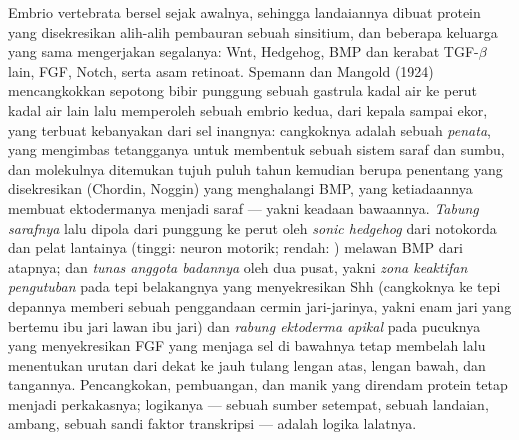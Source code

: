 \begin{definition}\label{def:b3:developmental-genetics:organiser}
%
Embrio vertebrata bersel sejak awalnya, sehingga landaiannya
dibuat protein yang disekresikan alih-alih pembauran sebuah sinsitium, dan
beberapa keluarga yang sama mengerjakan segalanya: Wnt, Hedgehog, BMP dan kerabat
TGF-$\beta$ lain, FGF, Notch, serta asam retinoat. Spemann dan Mangold (1924)
mencangkokkan sepotong bibir punggung sebuah gastrula kadal air ke perut
kadal air lain lalu memperoleh sebuah embrio kedua, dari kepala sampai ekor, yang terbuat kebanyakan dari
sel inangnya: cangkoknya adalah sebuah \emph{penata}, yang mengimbas tetangganya untuk
membentuk sebuah sistem saraf dan sumbu, dan molekulnya ditemukan tujuh puluh
tahun kemudian berupa penentang yang disekresikan (Chordin, Noggin) yang menghalangi
BMP, yang ketiadaannya membuat ektodermanya menjadi saraf --- yakni keadaan bawaannya.
\emph{Tabung sarafnya} lalu dipola dari punggung ke perut oleh \emph{sonic
hedgehog} dari notokorda dan pelat lantainya (tinggi: neuron motorik; rendah:
) melawan BMP dari atapnya; dan \emph{tunas anggota badannya} oleh dua
pusat, yakni \emph{zona keaktifan pengutuban} pada tepi belakangnya
yang menyekresikan Shh (cangkoknya ke tepi depannya memberi sebuah penggandaan
cermin jari-jarinya, yakni enam jari yang bertemu ibu jari lawan ibu jari) dan
\emph{rabung ektoderma apikal} pada pucuknya yang menyekresikan FGF yang menjaga
sel di bawahnya tetap membelah lalu menentukan urutan dari dekat ke jauh
tulang lengan atas, lengan bawah, dan tangannya. Pencangkokan, pembuangan, dan manik yang direndam
protein tetap menjadi perkakasnya; logikanya --- sebuah sumber setempat, sebuah landaian,
ambang, sebuah sandi faktor transkripsi --- adalah logika lalatnya.
\end{definition}

